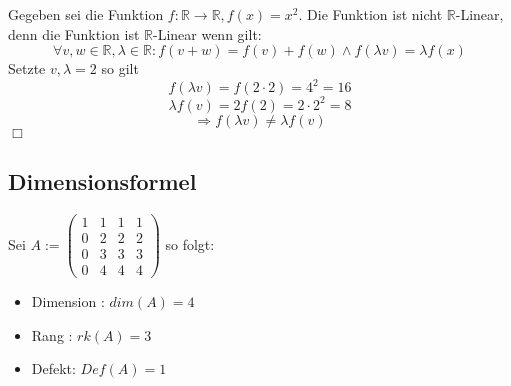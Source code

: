 \documentclass[12pt]{article}
\begin{document}

    Gegeben sei die Funktion $f:\mathbb{R} \rightarrow \mathbb{R}, f(x) = x^2$. \newline
    \newline
    Die Funktion ist nicht $\mathbb{R}$-Linear, denn \newline
    die Funktion ist $\mathbb{R}$-Linear wenn gilt:
    \[\forall v,w\in \mathbb{R}, \lambda \in \mathbb{R} : f(v+w) = f(v) + f(w) \wedge f(\lambda v) = \lambda f(x)\]
    Setzte $v,\lambda=2$ so gilt \newline
    \[f(\lambda v) = f(2\cdot2)=4^2=16\]
    \[\lambda f(v) = 2 f(2)=2\cdot 2^2=8\]
    \[\Rightarrow f(\lambda v) \neq \lambda f(v)\]
    \hfill $\Box$

    \subsection{Dimensionsformel}

    Sei $A:=\begin{pmatrix}1&1&1&1\\0&2&2&2\\0&3&3&3\\0&4&4&4\end{pmatrix}$ so folgt: \newline


    \begin{itemize}
        \item Dimension : $dim(A) = 4$
        \item Rang : $rk(A) = 3$
        \item Defekt: $Def(A) = 1$
    \end{itemize}
\end{document}
